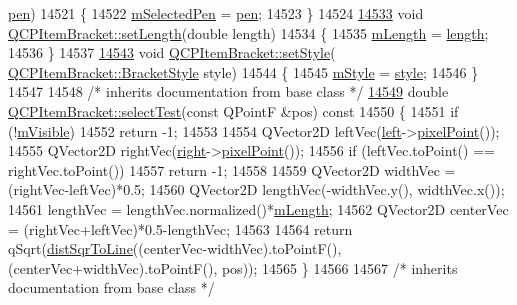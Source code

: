 \begin{DoxyCode}
      \hyperlink{a00116_a1f13fffa0a0faac34ec342973e613a4a}{pen})
14521 \{
14522   \hyperlink{a00033_adcfb53602d1802d00e2de4fd6df6b291}{mSelectedPen} = \hyperlink{a00033_a8963ff4a232b649c83d2461fd3c30d39}{pen};
14523 \}
14524 
\hypertarget{a00115_source_l14533}{}\hyperlink{a00033_ac7cfc3da7da9b5c5ac5dfbe4f0351b2a}{14533} \textcolor{keywordtype}{void} \hyperlink{a00033_ac7cfc3da7da9b5c5ac5dfbe4f0351b2a}{QCPItemBracket::setLength}(\textcolor{keywordtype}{double} length)
14534 \{
14535   \hyperlink{a00033_ab3d99bba8da18eb4d0e0cb23dded33b2}{mLength} = \hyperlink{a00033_aed5126eafcb1381ee5718499c20ba023}{length};
14536 \}
14537 
\hypertarget{a00115_source_l14543}{}\hyperlink{a00033_a612dffa2373422eef8754d690add3703}{14543} \textcolor{keywordtype}{void} \hyperlink{a00033_a612dffa2373422eef8754d690add3703}{QCPItemBracket::setStyle}(
      \hyperlink{a00033_a7ac3afd0b24a607054e7212047d59dbd}{QCPItemBracket::BracketStyle} style)
14544 \{
14545   \hyperlink{a00033_ac911907184c824d621f274f8e0990080}{mStyle} = \hyperlink{a00033_afad726f453f70fe77c0e9c2f260fff97}{style};
14546 \}
14547 
14548 \textcolor{comment}{/* inherits documentation from base class */}
\hypertarget{a00115_source_l14549}{}\hyperlink{a00033_a3e4bf2f77e147e46e375b7aa288f52ae}{14549} \textcolor{keywordtype}{double} \hyperlink{a00033_a3e4bf2f77e147e46e375b7aa288f52ae}{QCPItemBracket::selectTest}(\textcolor{keyword}{const} QPointF &pos)\textcolor{keyword}{ const}
14550 \textcolor{keyword}{}\{
14551   \textcolor{keywordflow}{if} (!\hyperlink{a00044_a62e3aed8427d6ce3ccf716f285106cb3}{mVisible})
14552     \textcolor{keywordflow}{return} -1;
14553   
14554   QVector2D leftVec(\hyperlink{a00033_af6cc6d27d96171778c6927d6edce48b0}{left}->\hyperlink{a00038_ae490f9c76ee2ba33752c495d3b6e8fb5}{pixelPoint}());
14555   QVector2D rightVec(\hyperlink{a00033_afa6c1360b05a50c4e0df37b3cebab6be}{right}->\hyperlink{a00038_ae490f9c76ee2ba33752c495d3b6e8fb5}{pixelPoint}());
14556   \textcolor{keywordflow}{if} (leftVec.toPoint() == rightVec.toPoint())
14557     \textcolor{keywordflow}{return} -1;
14558   
14559   QVector2D widthVec = (rightVec-leftVec)*0.5;
14560   QVector2D lengthVec(-widthVec.y(), widthVec.x());
14561   lengthVec = lengthVec.normalized()*\hyperlink{a00033_ab3d99bba8da18eb4d0e0cb23dded33b2}{mLength};
14562   QVector2D centerVec = (rightVec+leftVec)*0.5-lengthVec;
14563   
14564   \textcolor{keywordflow}{return} qSqrt(\hyperlink{a00022_acdca343717d625b8abb3c3e38c0ed39d}{distSqrToLine}((centerVec-widthVec).toPointF(), (centerVec+widthVec).toPointF(),
       pos));
14565 \}
14566 
14567 \textcolor{comment}{/* inherits documentation from base class */}

\end{DoxyCode}

